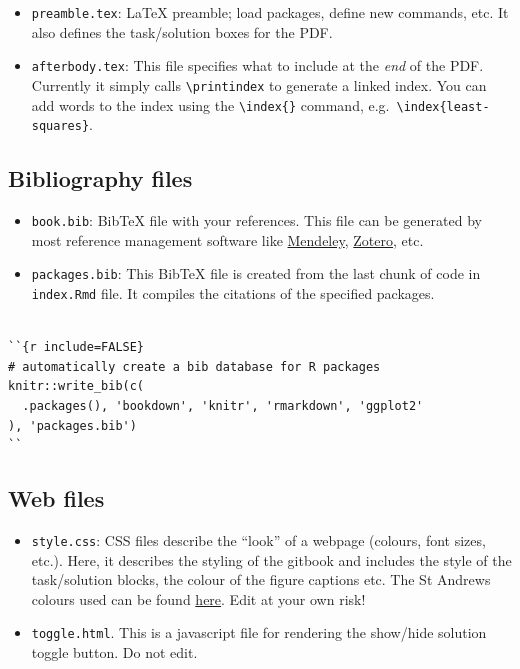 \documentclass[
]{book}
\theoremstyle{definition}
\theoremstyle{definition}
\theoremstyle{definition}
\theoremstyle{remark}
\begin{document}
\begin{itemize}
\item
  \texttt{preamble.tex}: LaTeX preamble; load packages, define new commands, etc. It also defines the task/solution boxes for the PDF.
\item
  \texttt{afterbody.tex}: This file specifies what to include at the \emph{end} of the PDF. Currently it simply calls \texttt{\textbackslash{}printindex} to generate a linked index.
  You can add words to the index using the \texttt{\textbackslash{}index\{\}} command, e.g.~\texttt{\textbackslash{}index\{least-squares\}}.
\end{itemize}

\hypertarget{bibliography-files}{%
\subsection*{Bibliography files}\label{bibliography-files}}

\begin{itemize}
\item
  \texttt{book.bib}: BibTeX file with your references. This file can be generated by most reference management software like \href{https://www.mendeley.com/}{Mendeley}, \href{https://www.zotero.org/}{Zotero}, etc.
\item
  \texttt{packages.bib}: This BibTeX file is created from the last chunk of code in \texttt{index.Rmd} file. It compiles the citations of the specified packages.
\end{itemize}

\begin{verbatim}

``{r include=FALSE}
# automatically create a bib database for R packages
knitr::write_bib(c(
  .packages(), 'bookdown', 'knitr', 'rmarkdown', 'ggplot2'
), 'packages.bib')
``
\end{verbatim}

\hypertarget{web-files}{%
\subsection*{Web files}\label{web-files}}

\begin{itemize}
\item
  \texttt{style.css}: CSS files describe the ``look'' of a webpage (colours, font sizes, etc.). Here, it describes the styling of the gitbook and includes the style of the task/solution blocks, the colour of the figure captions etc. The St Andrews colours used can be found \href{https://www.st-andrews.ac.uk/brand/design-guidelines/colours/}{here}. Edit at your own risk!
\item
  \texttt{toggle.html}. This is a javascript file for rendering the show/hide solution toggle button. Do not edit.
\end{itemize}
\end{document}
